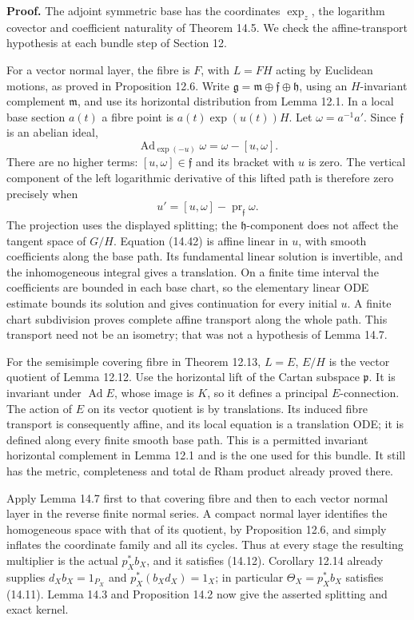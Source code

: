 \documentclass[
  11pt,
]{article}
\begin{document}
\textbf{Proof.} The adjoint symmetric base has the coordinates
\(\exp_z\), the logarithm covector and coefficient naturality of Theorem
14.5. We check the affine-transport hypothesis at each bundle step of
Section 12.

For a vector normal layer, the fibre is \(F\), with \(L=FH\) acting by
Euclidean motions, as proved in Proposition 12.6. Write
\(\mathfrak g=\mathfrak m\oplus\mathfrak f\oplus\mathfrak h\), using an
\(H\)-invariant complement \(\mathfrak m\), and use its horizontal
distribution from Lemma 12.1. In a local base section \(a(t)\) a fibre
point is \(a(t)\exp(u(t))H\). Let \(\omega=a^{-1}a'\). Since
\(\mathfrak f\) is an abelian ideal, \[
\operatorname{Ad}_{\exp(-u)}\omega
 =\omega-[u,\omega].
\tag{14.41}
\] There are no higher terms: \([u,\omega]\in\mathfrak f\) and its
bracket with \(u\) is zero. The vertical component of the left
logarithmic derivative of this lifted path is therefore zero precisely
when \[
u'=[u,\omega]-\operatorname{pr}_{\mathfrak f}\omega.
\tag{14.42}
\] The projection uses the displayed splitting; the
\(\mathfrak h\)-component does not affect the tangent space of \(G/H\).
Equation (14.42) is affine linear in \(u\), with smooth coefficients
along the base path. Its fundamental linear solution is invertible, and
the inhomogeneous integral gives a translation. On a finite time
interval the coefficients are bounded in each base chart, so the
elementary linear ODE estimate bounds its solution and gives
continuation for every initial \(u\). A finite chart subdivision proves
complete affine transport along the whole path. This transport need not
be an isometry; that was not a hypothesis of Lemma 14.7.

For the semisimple covering fibre in Theorem 12.13, \(L=E\), \(E/H\) is
the vector quotient of Lemma 12.12. Use the horizontal lift of the
Cartan subspace \(\mathfrak p\). It is invariant under
\(\operatorname{Ad}E\), whose image is \(K\), so it defines a principal
\(E\)-connection. The action of \(E\) on its vector quotient is by
translations. Its induced fibre transport is consequently affine, and
its local equation is a translation ODE; it is defined along every
finite smooth base path. This is a permitted invariant horizontal
complement in Lemma 12.1 and is the one used for this bundle. It still
has the metric, completeness and total de Rham product already proved
there.

Apply Lemma 14.7 first to that covering fibre and then to each vector
normal layer in the reverse finite normal series. A compact normal layer
identifies the homogeneous space with that of its quotient, by
Proposition 12.6, and simply inflates the coordinate family and all its
cycles. Thus at every stage the resulting multiplier is the actual
\(p_X^*b_X\), and it satisfies (14.12). Corollary 12.14 already supplies
\(d_Xb_X=1_{P_X}\) and \(p_X^*(b_Xd_X)=1_X\); in particular
\(\Theta_X=p_X^*b_X\) satisfies (14.11). Lemma 14.3 and Proposition 14.2
now give the asserted splitting and exact kernel.
\end{document}
